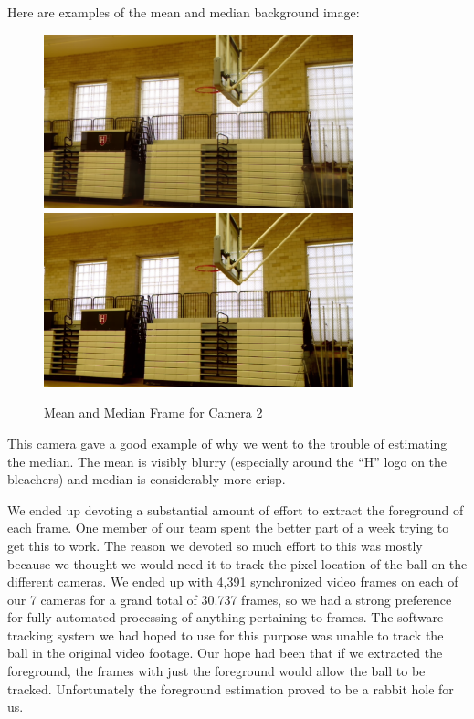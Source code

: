 \documentclass{article}
\begin{document}
Here are examples of the mean and median background image:
\begin{figure}[H]
\centering
\includegraphics[width=0.80\textwidth]{Camera2_mean.png}
\includegraphics[width=0.80\textwidth]{Camera2_median.png}
\caption{Mean and Median Frame for Camera 2}
\end{figure}
This camera gave a good example of why we went to the trouble of estimating the median.
The mean is visibly blurry (especially around the ``H'' logo on the bleachers) and median is considerably more crisp.

We ended up devoting a substantial amount of effort to extract the foreground of each frame.
One member of our team spent the better part of a week trying to get this to work.
The reason we devoted so much effort to this was mostly because we thought we would need it
to track the pixel location of the ball on the different cameras.  
We ended up with 4,391 synchronized video frames on each of our 7 cameras for a grand total of
30.737 frames, so we had a strong preference for fully automated processing of anything pertaining to frames.
The software tracking system we had hoped to use for this purpose was unable to track the ball in the original video footage.
Our hope had been that if we extracted the foreground, the frames with just the foreground would allow the ball to be tracked.
Unfortunately the foreground estimation proved to be a rabbit hole for us.
\end{document}
